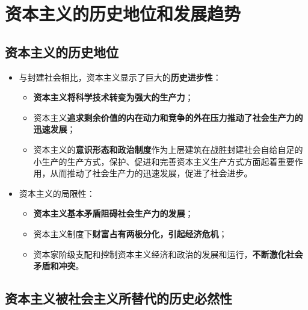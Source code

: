 \documentclass[
]{article}
\begin{document}
\hypertarget{ux8d44ux672cux4e3bux4e49ux7684ux5386ux53f2ux5730ux4f4dux548cux53d1ux5c55ux8d8bux52bf}{%
\section{资本主义的历史地位和发展趋势}\label{ux8d44ux672cux4e3bux4e49ux7684ux5386ux53f2ux5730ux4f4dux548cux53d1ux5c55ux8d8bux52bf}}

\hypertarget{ux8d44ux672cux4e3bux4e49ux7684ux5386ux53f2ux5730ux4f4d}{%
\subsection{资本主义的历史地位}\label{ux8d44ux672cux4e3bux4e49ux7684ux5386ux53f2ux5730ux4f4d}}

\begin{itemize}
\item
  与封建社会相比，资本主义显示了巨大的\textbf{历史进步性}：

  \begin{itemize}
  \item
    \textbf{资本主义将科学技术转变为强大的生产力}；
  \item
    资本主义\textbf{追求剩余价值的内在动力和竞争的外在压力推动了社会生产力的迅速发展}；
  \item
    资本主义的\textbf{意识形态和政治制度}作为上层建筑在战胜封建社会自给自足的小生产的生产方式，保护、促进和完善资本主义生产方式方面起着重要作用，从而推动了社会生产力的迅速发展，促进了社会进步。
  \end{itemize}
\item
  资本主义的局限性：

  \begin{itemize}
  \item
    \textbf{资本主义基本矛盾阻碍社会生产力的发展}；
  \item
    资本主义制度下\textbf{财富占有两极分化，引起经济危机}；
  \item
    资本家阶级支配和控制资本主义经济和政治的发展和运行，\textbf{不断激化社会矛盾和冲突}。
  \end{itemize}
\end{itemize}

\hypertarget{ux8d44ux672cux4e3bux4e49ux88abux793eux4f1aux4e3bux4e49ux6240ux66ffux4ee3ux7684ux5386ux53f2ux5fc5ux7136ux6027}{%
\subsection{资本主义被社会主义所替代的历史必然性}\label{ux8d44ux672cux4e3bux4e49ux88abux793eux4f1aux4e3bux4e49ux6240ux66ffux4ee3ux7684ux5386ux53f2ux5fc5ux7136ux6027}}
\end{document}
